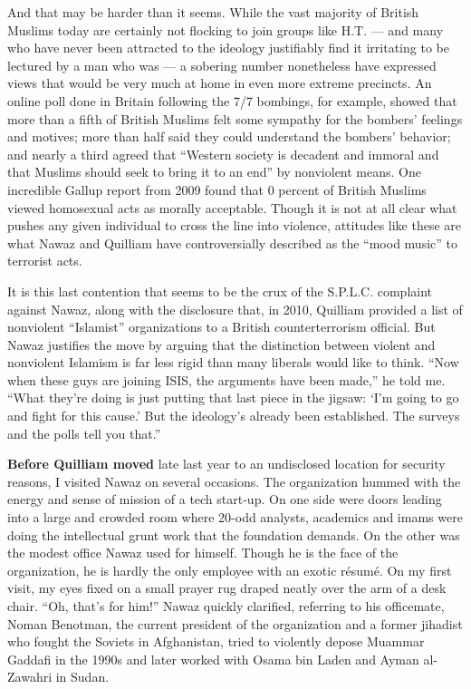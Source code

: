 And that may be harder than it seems. While the vast majority of British
Muslims today are certainly not flocking to join groups like H.T. ---
and many who have never been attracted to the ideology justifiably find
it irritating to be lectured by a man who was --- a sobering number
nonetheless have expressed views that would be very much at home in even
more extreme precincts. An online poll done in Britain following the 7/7
bombings, for example, showed that more than a fifth of British Muslims
felt some sympathy for the bombers' feelings and motives; more than half
said they could understand the bombers' behavior; and nearly a third
agreed that ``Western society is decadent and immoral and that Muslims
should seek to bring it to an end'' by nonviolent means. One incredible
Gallup report from 2009 found that 0 percent of British Muslims viewed
homosexual acts as morally acceptable. Though it is not at all clear
what pushes any given individual to cross the line into violence,
attitudes like these are what Nawaz and Quilliam have controversially
described as the ``mood music'' to terrorist acts.

It is this last contention that seems to be the crux of the S.P.L.C.
complaint against Nawaz, along with the disclosure that, in 2010,
Quilliam provided a list of nonviolent ``Islamist'' organizations to a
British counterterrorism official. But Nawaz justifies the move by
arguing that the distinction between violent and nonviolent Islamism is
far less rigid than many liberals would like to think. ``Now when these
guys are joining ISIS, the arguments have been made,'' he told me.
``What they're doing is just putting that last piece in the jigsaw: `I'm
going to go and fight for this cause.' But the ideology's already been
established. The surveys and the polls tell you that.''

\textbf{Before Quilliam moved} late last year to an undisclosed location
for security reasons, I visited Nawaz on several occasions. The
organization hummed with the energy and sense of mission of a tech
start-up. On one side were doors leading into a large and crowded room
where 20-odd analysts, academics and imams were doing the intellectual
grunt work that the foundation demands. On the other was the modest
office Nawaz used for himself. Though he is the face of the
organization, he is hardly the only employee with an exotic résumé. On
my first visit, my eyes fixed on a small prayer rug draped neatly over
the arm of a desk chair. ``Oh, that's for him!'' Nawaz quickly
clarified, referring to his officemate, Noman Benotman, the current
president of the organization and a former jihadist who fought the
Soviets in Afghanistan, tried to violently depose Muammar Gaddafi in the
1990s and later worked with Osama bin Laden and Ayman al-Zawahri in
Sudan.

